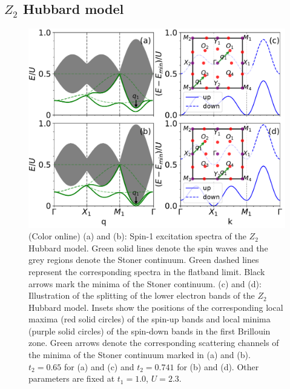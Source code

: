 \documentclass[amsmath,superscriptaddress,showpacs,aps,prb,twocolumn]{revtex4-1}
\begin{document}
\subsection{$Z_2$ Hubbard model}\label{ZHM}
\begin{figure}
\includegraphics[width=\columnwidth]{tispectrum}
\caption{(Color online) (a) and (b): Spin-1 excitation spectra of the $Z_2$ Hubbard model. Green solid lines denote the spin waves and the grey regions denote the Stoner continuum. Green dashed lines represent the corresponding spectra in the flatband limit. Black arrows mark the minima of the Stoner continuum. (c) and (d): Illustration of the splitting of the lower electron bands of the $Z_2$ Hubbard model. Insets show the positions of the corresponding local maxima (red solid circles) of the spin-up bands and local minima (purple solid circles) of the spin-down bands in the first Brillouin zone. Green arrows denote the corresponding scattering channels of the minima of the Stoner continuum marked in (a) and (b). $t_2=0.65$ for (a) and (c) and $t_2=0.741$ for (b) and (d). Other parameters are fixed at $t_1=1.0$, $U=2.3$.}
\label{tispectrum}
\end{figure}
\end{document}
